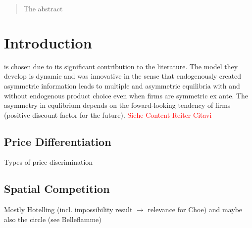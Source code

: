 \documentclass[a4paper, 11 pt, fleqn]{article}
\begin{document}
\newpage
{}
\tableofcontents
\listoffigures
\newpage


\newpage


\begin{abstract}
	The abstract
\end{abstract}
%
\section{Introduction} \label{sec:intro}
%
\citet{Choe.2018} is chosen due to its significant contribution to the literature. The model they develop is dynamic and
was innovative in the sense that endogenously created asymmetric information leads to multiple and asymmetric equilibria with
and without endogenous product choice even when firms are symmetric ex ante. The asymmetry in equlibrium depends on the foward-looking
tendency of firms (positive discount factor for the future). \textcolor{red}{Siehe Content-Reiter Citavi}

\subsection{Price Differentiation} \label{ssec:pricediff}
Types of price discrimination
%
\subsection{Spatial Competition}
Mostly Hotelling (incl. impossibility result $\to$ relevance for Choe) and maybe also the circle (see Belleflamme)
%
\end{document}
